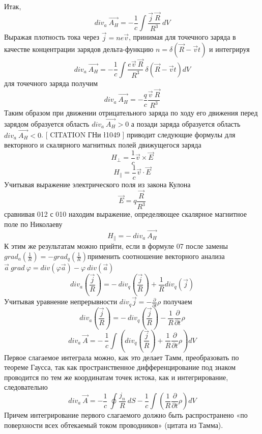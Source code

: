 \documentclass[11pt]{article}
\begin{document}
Итак,
\[di{{v}_{a}}\ \overrightarrow{{{A}_{H}}}=-\frac{1}{c}\int{\frac{\overrightarrow{j}\ \overrightarrow{R}}{{{R}^{3}}}}\ dV\]
Выражая плотность тока через
\(\overrightarrow{j}=ne\overrightarrow{v}\), принимая для точечного
заряда в качестве концентрации зарядов дельта-функцию
\(n=\delta \left( \overrightarrow{R}-\overrightarrow{v}t \right)\) и
интегрируя
\[di{{v}_{a}}\ \overrightarrow{{{A}_{H}}}=-\frac{1}{c}\int{\frac{e\overrightarrow{v}\ \overrightarrow{R}}{{{R}^{3}}}}\ \delta \left( \overrightarrow{R}-\overrightarrow{v}t \right)dV\]
для точечного заряда получим
\[di{{v}_{a}}\ \overrightarrow{{{A}_{H}}}=-\frac{q}{c}\frac{\overrightarrow{v}\ \overrightarrow{R}}{{{R}^{3}}}\]
Таким образом при движении отрицательного заряда по ходу его движения
перед зарядом образуется область
\(di{{v}_{a}}\ \overrightarrow{{{A}_{H}}}>0\) а позади заряда образуется
область \(di{{v}_{a}}\ \overrightarrow{{{A}_{H}}}<0\). {[} CITATION ГНи
\l 1049 {]} приводит следующие формулы для векторного и скалярного
магнитных полей движущегося заряда
\[{{H}_{\bot }}=\frac{1}{c}\overrightarrow{v}\times \overrightarrow{E}\]
\[{{H}_{\parallel }}=\frac{1}{c}\overrightarrow{v}\cdot \overrightarrow{E}\]
Учитывая выражение электрического поля из закона Кулона
\[\overrightarrow{E}=q\frac{\overrightarrow{R}}{{{R}^{3}}}\] сравнивая
012 с 010 находим выражение, определяющее скалярное магнитное поле по
Николаеву
\[{{H}_{\parallel }}=-\ di{{v}_{a}}\ \overrightarrow{{{A}_{H}}}\] К этим
же результатам можно прийти, если в формуле 07 после замены
\(gra{{d}_{a}}\left( \frac{1}{R} \right)=-gra{{d}_{q}}\left( \frac{1}{R} \right)\)применить
соотношение векторного анализа
\(\overrightarrow{a}\ grad\ \varphi =div\left( \varphi \overrightarrow{a} \right)-\varphi \ div\left( \overrightarrow{a} \right)\)
\[di{{v}_{a}}\left( \frac{\overrightarrow{j}}{R} \right)=-\ di{{v}_{q}}\left( \frac{\overrightarrow{j}}{R} \right)+\frac{1}{R}di{{v}_{q}}\left( \overrightarrow{j} \right)\]
Учитывая уравнение непрерывности
$di{{v}_{q}}\overrightarrow{j}=-\frac{\partial}{\partial t}\rho$
получаем
\[di{{v}_{a}}\left( \frac{\overrightarrow{j}}{R} \right)=-\ di{{v}_{q}}\left( \frac{\overrightarrow{j}}{R} \right)-\frac{1}{R}\frac{\partial }{\partial t}\rho \]
\[di{{v}_{a}}\ \overrightarrow{A}=-\ \frac{1}{c}\int{\left( di{{v}_{q}}\left( \frac{\overrightarrow{j}}{R} \right)+\frac{1}{R}\frac{\partial }{\partial t}\rho  \right)dV}\]
Первое слагаемое интеграла можно, как это делает Тамм, преобразовать по
теореме Гаусса, так как пространственное дифференцирование под знаком
проводится по тем же координатам точек истока, как и интегрирование,
следовательно
\[di{{v}_{a}}\ \overrightarrow{A}=-\frac{1}{c}\ \oint{\frac{{{j}_{n}}}{R}}\ dS-\frac{1}{c}\int{\left( \frac{1}{R}\frac{\partial }{\partial t}\rho  \right)dV}\]
Причем интегрирование первого слагаемого должно быть распространено «по
поверхности всех обтекаемый током проводников» (цитата из Тамма).
\end{document}
